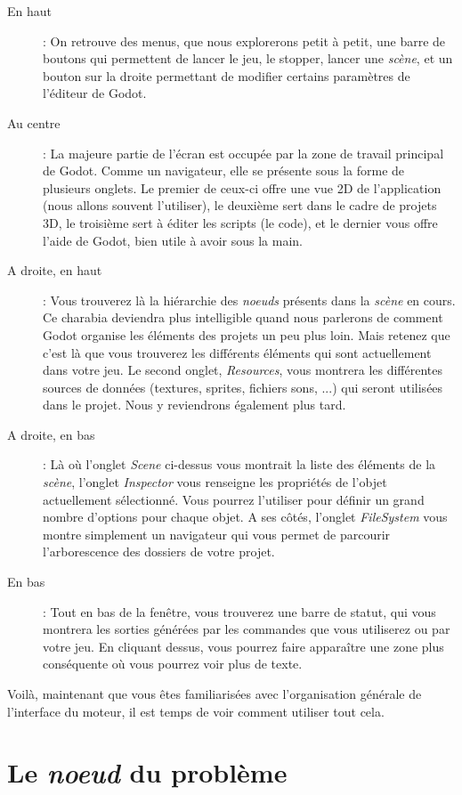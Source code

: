 \begin{description}
\item[En haut] : On retrouve des menus, que nous explorerons petit à petit, une barre de boutons qui permettent de lancer le jeu, le stopper, lancer une \emph{scène}, et un bouton sur la droite permettant de modifier certains paramètres de l'éditeur de Godot.
\item[Au centre] : La majeure partie de l'écran est occupée par la zone de travail principal de Godot. Comme un navigateur, elle se présente sous la forme de plusieurs onglets. Le premier de ceux-ci offre une vue 2D de l'application (nous allons souvent l'utiliser), le deuxième sert dans le cadre de projets 3D, le troisième sert à éditer les scripts (le code), et le dernier vous offre l'aide de Godot, bien utile à avoir sous la main.
\item[A droite, en haut] : Vous trouverez là la hiérarchie des \emph{noeuds} présents dans la \emph{scène} en cours. Ce charabia deviendra plus intelligible quand nous parlerons de comment Godot organise les éléments des projets un peu plus loin. Mais retenez que c'est là que vous trouverez les différents éléments qui sont actuellement dans votre jeu. Le second onglet, \emph{Resources}, vous montrera les différentes sources de données (textures, sprites, fichiers sons, ...) qui seront utilisées dans le projet. Nous y reviendrons également plus tard.
\item[A droite, en bas] : Là où l'onglet \emph{Scene} ci-dessus vous montrait la liste des éléments de la \emph{scène}, l'onglet \emph{Inspector} vous renseigne les propriétés de l'objet actuellement sélectionné. Vous pourrez l'utiliser pour définir un grand nombre d'options pour chaque objet. A ses côtés, l'onglet \emph{FileSystem} vous montre simplement un navigateur qui vous permet de parcourir l'arborescence des dossiers de votre projet.
\item[En bas] : Tout en bas de la fenêtre, vous trouverez une barre de statut, qui vous montrera les sorties générées par les commandes que vous utiliserez ou par votre jeu. En cliquant dessus, vous pourrez faire apparaître une zone plus conséquente où vous pourrez voir plus de texte.
\end{description}

Voilà, maintenant que vous êtes familiarisées avec l'organisation générale de l'interface du moteur, il est temps de voir comment utiliser tout cela.

\section{Le \emph{noeud} du problème}

